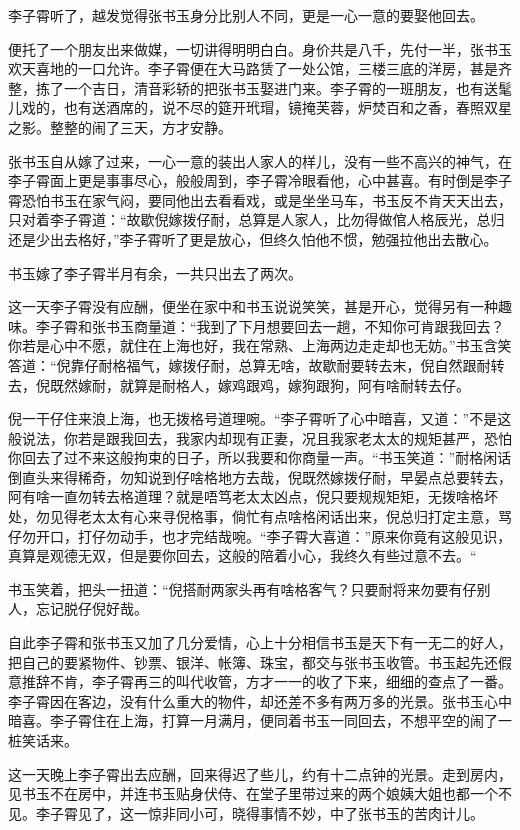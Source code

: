 \documentclass[12pt,UTF8]{ctexbook}
\begin{document}
{{{李子霄听了，越发觉得张书玉身分比别人不同，更是一心一意的要娶他回去。

便托了一个朋友出来做媒，一切讲得明明白白。身价共是八千，先付一半，张书玉欢天喜地的一口允许。李子霄便在大马路赁了一处公馆，三楼三底的洋房，甚是齐整，拣了一个吉日，清音彩轿的把张书玉娶进门来。李子霄的一班朋友，也有送髦儿戏的，也有送酒席的，说不尽的筵开玳瑁，镜掩芙蓉，炉焚百和之香，春照双星之影。整整的闹了三天，方才安静。

张书玉自从嫁了过来，一心一意的装出人家人的样儿，没有一些不高兴的神气，在李子霄面上更是事事尽心，般般周到，李子霄冷眼看他，心中甚喜。有时倒是李子霄恐怕书玉在家气闷，要同他出去看看戏，或是坐坐马车，书玉反不肯天天出去，只对着李子霄道：“故歇倪嫁拨仔耐，总算是人家人，比勿得做倌人格辰光，总归还是少出去格好，”李子霄听了更是放心，但终久怕他不惯，勉强拉他出去散心。

书玉嫁了李子霄半月有余，一共只出去了两次。

这一天李子霄没有应酬，便坐在家中和书玉说说笑笑，甚是开心，觉得另有一种趣味。李子霄和张书玉商量道：“我到了下月想要回去一趟，不知你可肯跟我回去？你若是心中不愿，就住在上海也好，我在常熟、上海两边走走却也无妨。”书玉含笑答道：“倪靠仔耐格福气，嫁拨仔耐，总算无啥，故歇耐要转去末，倪自然跟耐转去，倪既然嫁耐，就算是耐格人，嫁鸡跟鸡，嫁狗跟狗，阿有啥耐转去仔。

倪一干仔住来浪上海，也无拨格号道理啘。“李子霄听了心中暗喜，又道：”不是这般说法，你若是跟我回去，我家内却现有正妻，况且我家老太太的规矩甚严，恐怕你回去了过不来这般拘束的日子，所以我要和你商量一声。“书玉笑道：”耐格闲话倒直头来得稀奇，勿知说到仔啥格地方去哉，倪既然嫁拨仔耐，早晏点总要转去，阿有啥一直勿转去格道理？就是唔笃老太太凶点，倪只要规规矩矩，无拨啥格坏处，勿见得老太太有心来寻倪格事，倘忙有点啥格闲话出来，倪总归打定主意，骂仔勿开口，打仔勿动手，也才完结哉啘。“李子霄大喜道：”原来你竟有这般见识，真算是观德无双，但是要你回去，这般的陪着小心，我终久有些过意不去。“

书玉笑着，把头一扭道：“倪搭耐两家头再有啥格客气？只要耐将来勿要有仔别人，忘记脱仔倪好哉。

自此李子霄和张书玉又加了几分爱情，心上十分相信书玉是天下有一无二的好人，把自己的要紧物件、钞票、银洋、帐簿、珠宝，都交与张书玉收管。书玉起先还假意推辞不肯，李子霄再三的叫代收管，方才一一的收了下来，细细的查点了一番。李子霄因在客边，没有什么重大的物件，却还差不多有两万多的光景。张书玉心中暗喜。李子霄住在上海，打算一月满月，便同着书玉一同回去，不想平空的闹了一桩笑话来。

这一天晚上李子霄出去应酬，回来得迟了些儿，约有十二点钟的光景。走到房内，见书玉不在房中，并连书玉贴身伏侍、在堂子里带过来的两个娘姨大姐也都一个不见。李子霄见了，这一惊非同小可，晓得事情不妙，中了张书玉的苦肉计儿。

}}}
\end{document}
